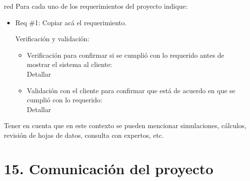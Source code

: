 \documentclass[11pt]{charter}
\begin{document}
\begin{consigna}{red}
Para cada uno de los requerimientos del proyecto indique:
\begin{itemize} 
\item Req \#1: Copiar acá el requerimiento.

Verificación y validación:

\begin{itemize}
\item Verificación para confirmar si se cumplió con lo requerido antes de mostrar el sistema al cliente:\\
Detallar 
\item Validación con el cliente para confirmar que está de acuerdo en que se cumplió con lo requerido:\\
Detallar  
\end{itemize}

\end{itemize}

Tener en cuenta que en este contexto se pueden mencionar simulaciones, cálculos, revisión de hojas de datos, consulta con expertos, etc.

\end{consigna}

\section{15. Comunicación del proyecto}
\label{sec:comunicaciones}
\end{document}

